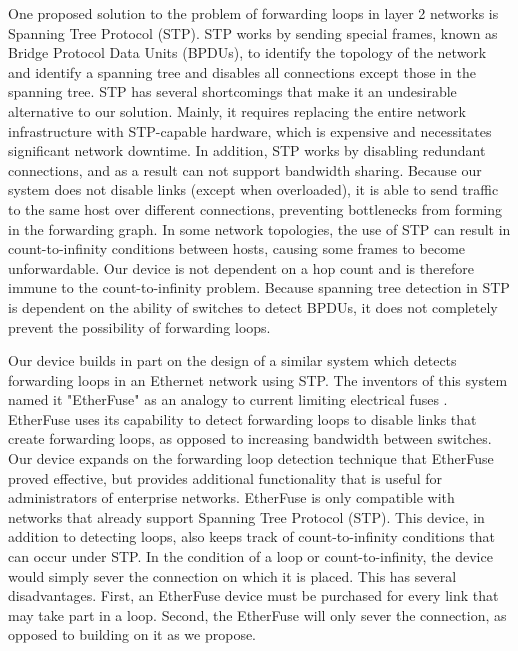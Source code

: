 	  One proposed solution to the problem of forwarding loops in layer 2 networks is Spanning Tree Protocol (STP).
	  STP works by sending special frames, known as Bridge Protocol Data Units (BPDUs), to identify the topology of the network and identify a spanning tree and disables all connections except those in the spanning tree.
	  STP has several shortcomings that make it an undesirable alternative to our solution.
	  Mainly, it requires replacing the entire network infrastructure with STP-capable hardware, which is expensive and necessitates significant network downtime.
	  In addition, STP works by disabling redundant connections, and as a result can not support bandwidth sharing.
	  Because our system does not disable links (except when overloaded), it is able to send traffic to the same host over different connections, preventing bottlenecks from forming in the forwarding graph.
    In some network topologies, the use of STP can result in count-to-infinity conditions between hosts, causing some frames to become unforwardable.
    Our device is not dependent on a hop count and is therefore immune to the count-to-infinity problem.
	  Because spanning tree detection in STP is dependent on the ability of switches to detect BPDUs, it does not completely prevent the possibility of forwarding loops.
	
	  Our device builds in part on the design of a similar system which detects forwarding loops in an Ethernet network using STP.
	  The inventors of this system named it "EtherFuse" as an analogy to current limiting electrical fuses \cite{etherfuse}.
	  EtherFuse uses its capability to detect forwarding loops to disable links that create forwarding loops, as opposed to increasing bandwidth between switches.
	  Our device expands on the forwarding loop detection technique that EtherFuse proved effective, but provides additional functionality that is useful for administrators of enterprise networks.
	  EtherFuse is only compatible with networks that already support Spanning Tree Protocol (STP).
	  This device, in addition to detecting loops, also keeps track of count-to-infinity conditions that can occur under STP.
	  In the condition of a loop or count-to-infinity, the device would simply sever the connection on which it is placed.
	  This has several disadvantages.
	  First, an EtherFuse device must be purchased for every link that may take part in a loop.
	  Second, the EtherFuse will only sever the connection, as opposed to building on it as we propose.
	
